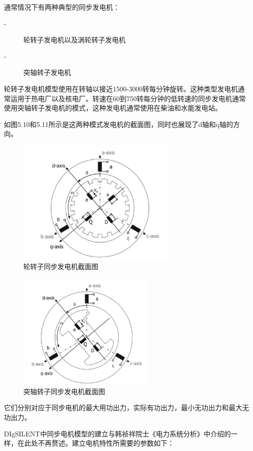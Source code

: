 通常情况下有两种典型的同步发电机：
\begin{description}
\item[-] 轮转子发电机以及涡轮转子发电机
\item[-] 突轴转子发电机
\end{description}

轮转子发电机模型使用在转轴以接近1500-3000转每分钟旋转。这种类型发电机通常运用于热电厂以及核电厂。转速在60到750转每分钟的低转速的同步发电机通常使用突轴转子发电机的模式，这种发电机通常使用在柴油和水能发电站。

如图5.10和5.11所示是这两种模式发电机的截面图，同时也展现了d轴和q轴的方向。

\begin{figure}[H]
\centering
\includegraphics[width=0.7\textwidth]{images/Paper_Fig_26.png}
\setcaptionwidth{\linewidth}
\caption{轮转子同步发电机截面图}
\end{figure}

\begin{figure}[H]
\centering
\includegraphics[width=0.6\textwidth]{images/Paper_Fig_27.png}
\setcaptionwidth{\linewidth}
\caption{突轴转子同步发电机截面图}
\end{figure}

它们分别对应于同步电机的最大用功出力，实际有功出力，最小无功出力和最大无功出力。
 
DIgSILENT中同步电机模型的建立与韩祯祥院士《电力系统分析》中介绍的一样，在此处不再赘述。建立电机特性所需要的参数如下：
